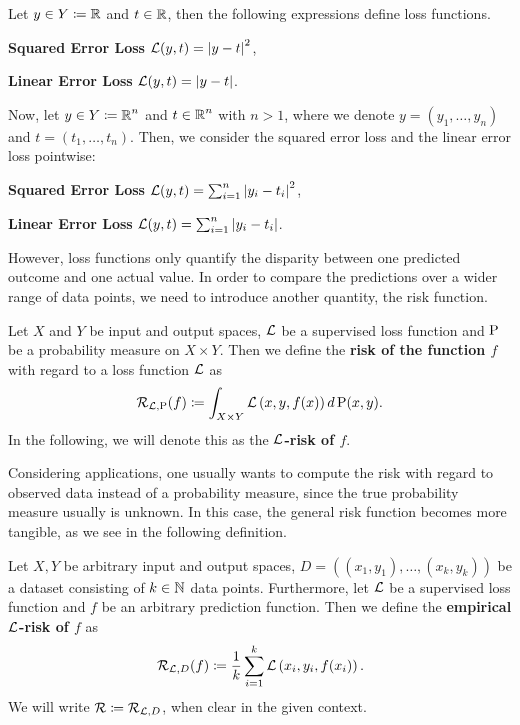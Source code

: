 \begin{example}\label{ex:supervised_loss}
Let $y\in Y\coloneqq \operatorname{\mathbb{R}}$ and $t\in \operatorname{\mathbb{R}}$, then the following expressions define loss functions.
\begin{mydescription}{}
\item[\textbf{Squared Error Loss}] $\operatorname{\mathcal{L}}(y, t) = \left|y - t\right|^2$,
\item[\textbf{Linear Error Loss}]  $\operatorname{\mathcal{L}}(y, t) = \left|y - t\right|$.
\end{mydescription}
Now, let $y\in Y \coloneqq \operatorname{\mathbb{R}}^n$ and $t\in\operatorname{\mathbb{R}}^n$ with $n>1$, where we denote $y = (y_1,\ldots, y_n)$ and $t = (t_1,\ldots, t_n)$. Then, we consider the squared error loss and the linear error loss pointwise:
\begin{mydescription}{}
\item[\textbf{Squared Error Loss}] $\operatorname{\mathcal{L}}(y, t) = \sum_{i=1}^n\left|y_i - t_i\right|^2$,
\item[\textbf{Linear Error Loss}]  $\operatorname{\mathcal{L}}(y, t) = \sum_{i=1}^n\left|y_i - t_i\right|$.
\end{mydescription}
\end{example}


However, loss functions only quantify the disparity between one predicted outcome and one actual value. In order to compare the predictions over a wider range of data points, we need to introduce another quantity, the risk function.


\begin{definition}\label{def:risk}
Let $X$ and $Y$ be input and output spaces, $\operatorname{\mathcal{L}}$ be a supervised loss function and $\operatorname{\text{P}}$ be a probability measure on $X \times Y$. Then we define the \textbf{risk of the function $f$} with regard to a loss function $\operatorname{\mathcal{L}}$ as
\begin{align*}
\operatorname{\mathcal{R}}_{\operatorname{\mathcal{L}}, \operatorname{\text{P}}}(f) \coloneqq \int_{X\times Y} \operatorname{\mathcal{L}}\left(x, y, f(x) \right) d \operatorname{\text{P}}(x, y).
\end{align*}
In the following, we will denote this as the \textbf{$\operatorname{\mathcal{L}}$-risk of $f$}.
\end{definition}


Considering applications, one usually wants to compute the risk with regard to observed data instead of a probability measure, since the true probability measure usually is unknown. In this case, the general risk function becomes more tangible, as we see in the following definition.


\begin{definition}\label{def:empirical_risk}
Let $X, Y$ be arbitrary input and output spaces, $D = \left((x_1,y_1), \ldots, (x_k,y_k)\right)$ be a dataset consisting of $k\in\operatorname{\mathbb{N}}$ data points. Furthermore, let $\operatorname{\mathcal{L}}$ be a supervised loss function and $f$ be an arbitrary prediction function. Then we define the \textbf{empirical $\operatorname{\mathcal{L}}$-risk of $f$} as
\begin{align*}
\operatorname{\mathcal{R}}_{\operatorname{\mathcal{L}}, D} (f) \coloneqq \frac{1}{k} \sum_{i=1}^{k} \operatorname{\mathcal{L}}\left(x_i, y_i, f(x_i)\right).
\end{align*}
We will write $\operatorname{\mathcal{R}} \coloneqq \operatorname{\mathcal{R}}_{\operatorname{\mathcal{L}}, D}$, when clear in the given context.
\end{definition}


